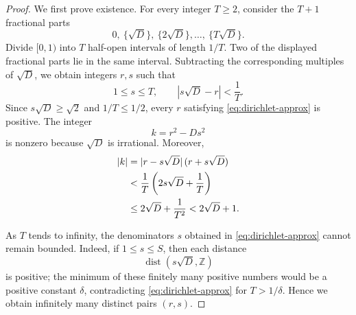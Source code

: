 \documentclass[a4paper,11pt]{amsart}
\numberwithin{equation}{section}
\theoremstyle{definition}
\theoremstyle{remark}
\newcommand{\Z}{\mathbb Z}
\begin{document}
\begin{proof}
We first prove existence.  For every integer \(T\geq2\), consider the
\(T+1\) fractional parts
\begin{equation*}
 0,\ \{\sqrt D\},\ \{2\sqrt D\},\ldots,\ \{T\sqrt D\}.
\end{equation*}
Divide \([0,1)\) into \(T\) half-open intervals of length \(1/T\).  Two of
the displayed fractional parts lie in the same interval.  Subtracting the
corresponding multiples of \(\sqrt D\), we obtain integers \(r,s\) such that
\begin{equation}\label{eq:dirichlet-approx}
 1\leq s\leq T,
 \qquad
 |s\sqrt D-r|<\frac1T.
\end{equation}
Since \(s\sqrt D\geq\sqrt2\) and \(1/T\leq1/2\), every \(r\)
satisfying \eqref{eq:dirichlet-approx} is positive.  The integer
\begin{equation}\label{eq:kdef}
 k=r^2-Ds^2
\end{equation}
is nonzero because \(\sqrt D\) is irrational.  Moreover,
\begin{align}\label{eq:kbound}
 |k|
 &=|r-s\sqrt D|\,(r+s\sqrt D)\notag\\
 &<\frac1T\left(2s\sqrt D+\frac1T\right)\notag\\
 &\leq2\sqrt D+\frac1{T^2}
 <2\sqrt D+1.
\end{align}

As \(T\) tends to infinity, the denominators \(s\) obtained in
\eqref{eq:dirichlet-approx} cannot remain bounded.  Indeed, if
\(1\leq s\leq S\), then each distance
\begin{equation*}
 \operatorname{dist}(s\sqrt D,\Z)
\end{equation*}
is positive; the minimum of these finitely many positive numbers would be a
positive constant \(\delta\), contradicting
\eqref{eq:dirichlet-approx} for \(T>1/\delta\).  Hence we obtain infinitely
many distinct pairs \((r,s)\).


\end{proof}
\end{document}
